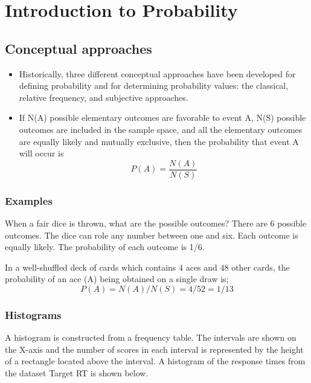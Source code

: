 \documentclass[]{report}
\begin{document}
\chapter{Introduction to Probability}







\section*{Conceptual approaches}
{
	\begin{itemize}
		\item Historically, three different conceptual approaches have been developed for defining probability and for
		determining probability values: the classical, relative frequency, and subjective approaches.\item If N(A) possible elementary outcomes are favorable to event A,
		N(S) possible outcomes are included in the sample space, and all the elementary outcomes are equally likely and
		mutually exclusive, then the probability that event A will occur is
		\[P(A) = \frac{N(A)}{N(S)}\]
	\end{itemize}
	
	
	
	\subsection*{Examples}
	When a fair dice is thrown, what are the possible outcomes? There are 6 possible outcomes. The dice can role any number between one and six. Each outcome is equally likely. The probability of each outcome is 1/6.
	
	
	In a well-shuffled deck of cards which contains 4 aces and 48 other cards, the probability of an ace (A)
	being obtained on a single draw is;
	\[ P(A)= N(A)/ N(S) = 4/52 = 1/13 \]
	
	
	
	
	
\subsection{Histograms}
A histogram is constructed from a frequency table. The intervals are shown on the X-axis and the number of scores in each interval is represented by the height of a rectangle located above the interval. A histogram of the response times from the dataset Target RT is shown below.



}
\end{document}
